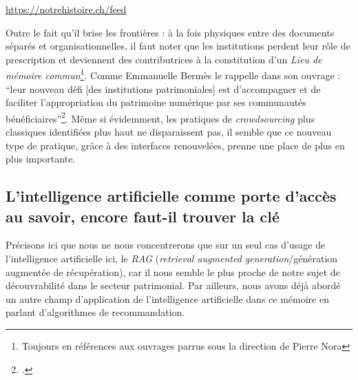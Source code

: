 \begin{center}
	\url{https://notrehistoire.ch/feed}
\end{center}

Outre le fait qu’il brise les frontières : à la fois physiques entre des documents séparés et organisationnelles, il faut noter que les institutions perdent leur rôle de prescription et deviennent des contributrices à la constitution d’un \textit{Lieu de mémoire commun}\footnote{Toujours en références aux ouvrages parrus sous la direction de Pierre Nora}. Comme Emmanuelle Bermès le rappelle dans son ouvrage : \enquote{leur nouveau défi [des institutions patrimoniales] est d’accompagner et de faciliter l’appropriation du patrimoine numérique par ses communautés bénéficiaires}\footcite[p. 186]{bermes2024}. Même si évidemment, les pratiques de \textit{crowdsourcing} plus classiques identifiées plus haut ne disparaissent pas, il semble que ce nouveau type de pratique, grâce à des interfaces renouvelées, prenne une place de plus en plus importante.


\subsection{L'intelligence artificielle comme porte d'accès au savoir, encore faut-il trouver la clé}

Précisons ici que nous ne nous concentrerons que sur un seul cas d’usage de l’intelligence artificielle ici, le \textit{RAG} (\textit{retrieval augmented generation}/génération augmentée de récupération), car il nous semble le plus proche de notre sujet de découvrabilité dans le secteur patrimonial. Par ailleurs, nous avons déjà abordé un autre champ d’application de l’intelligence artificielle dans ce mémoire en parlant d’algorithmes de recommandation.


